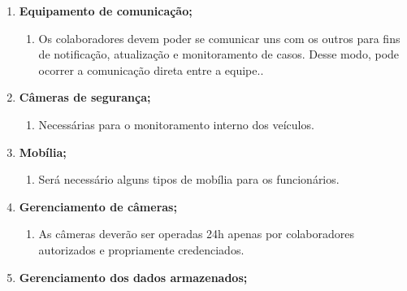 \begin{enumerate}
\begin{enumerate}
            \end{enumerate}


      \item \textbf{Equipamento de comunicação;}
            \begin{enumerate}

                  \item	Os colaboradores devem poder se comunicar uns com os outros para fins de notificação, atualização e monitoramento de casos. Desse modo, pode ocorrer a comunicação direta entre a equipe..



            \end{enumerate}

      \item \textbf {Câmeras de segurança;}
            \begin{enumerate}

                  \item	Necessárias para o monitoramento interno dos veículos.



            \end{enumerate}

      \item \textbf{Mobília;}
            \begin{enumerate}

                  \item	Será necessário alguns tipos de mobília para os funcionários.



            \end{enumerate}

      \item \textbf{Gerenciamento de câmeras;}
            \begin{enumerate}

                  \item	As câmeras deverão ser operadas 24h apenas por colaboradores autorizados e propriamente credenciados.



            \end{enumerate}

      \item \textbf{Gerenciamento dos dados armazenados;}
            \begin{enumerate}


\end{enumerate}
\end{enumerate}
